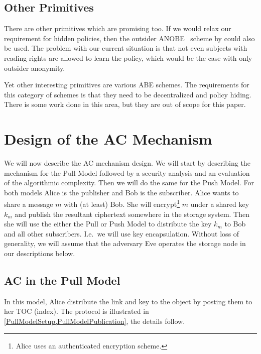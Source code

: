 \subsection{Other Primitives}

There are other primitives which are promising too.
If we would relax our requirement for hidden policies, then the outsider 
\ac{ANOBE}~\cite{oANOBE} scheme by \citeauthor{oANOBE} could also be used.
The problem with our current situation is that not even subjects with reading 
rights are allowed to learn the policy, which would be the case with only 
outsider anonymity.

Yet other interesting primitives are various \ac{ABE} schemes.
The requirements for this category of schemes is that they need to be 
decentralized and policy hiding.
There is some work done in this area, but they are out of scope for this paper.


\section[Scheme Design]{Design of the \acl*{AC} Mechanism}\label{Design}

We will now describe the \ac{AC} mechanism design.
We will start by describing the mechanism for the Pull Model followed by 
a security analysis and an evaluation of the algorithmic complexity.
Then we will do the same for the Push Model.
For both models Alice is the publisher and Bob is the subscriber.
Alice wants to share a message \(m\) with (at least) Bob.
She will encrypt\footnote{%
  Alice uses an authenticated encryption scheme.
} \(m\) under a shared key \(k_m\) and publish the resultant ciphertext 
somewhere in the storage system.
Then she will use the either the Pull or Push Model to distribute the key 
\(k_m\) to Bob and all other subscribers.
I.e.\ we will use key encapsulation.
Without loss of generality, we will assume that the adversary Eve operates the 
storage node in our descriptions below.

\subsection{\Acl*{AC} in the Pull Model}\label{PullModelAC}

In this model, Alice distribute the link and key to the object by posting them 
to her \ac{TOC} (index).
The protocol is illustrated in \cref{PullModelSetup,PullModelPublication}, the 
details follow.

